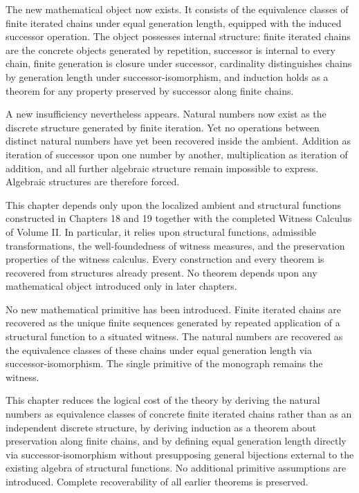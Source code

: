 \documentclass[12pt,anyside]{book}
\begin{document}
The new mathematical object now exists. It consists of the equivalence classes of finite iterated chains under equal generation length, equipped with the induced successor operation. The object possesses internal structure: finite iterated chains are the concrete objects generated by repetition, successor is internal to every chain, finite generation is closure under successor, cardinality distinguishes chains by generation length under successor-isomorphism, and induction holds as a theorem for any property preserved by successor along finite chains.

A new insufficiency nevertheless appears. Natural numbers now exist as the discrete structure generated by finite iteration. Yet no operations between distinct natural numbers have yet been recovered inside the ambient. Addition as iteration of successor upon one number by another, multiplication as iteration of addition, and all further algebraic structure remain impossible to express. Algebraic structures are therefore forced.

\begin{dependencyaudit}
This chapter depends only upon the localized ambient and structural functions constructed in Chapters 18 and 19 together with the completed Witness Calculus of Volume II. In particular, it relies upon structural functions, admissible transformations, the well-foundedness of witness measures, and the preservation properties of the witness calculus. Every construction and every theorem is recovered from structures already present. No theorem depends upon any mathematical object introduced only in later chapters.
\end{dependencyaudit}

\begin{primitiveaudit}
No new mathematical primitive has been introduced. Finite iterated chains are recovered as the unique finite sequences generated by repeated application of a structural function to a situated witness. The natural numbers are recovered as the equivalence classes of these chains under equal generation length via successor-isomorphism. The single primitive of the monograph remains the witness.
\end{primitiveaudit}

\begin{reductionaudit}
This chapter reduces the logical cost of the theory by deriving the natural numbers as equivalence classes of concrete finite iterated chains rather than as an independent discrete structure, by deriving induction as a theorem about preservation along finite chains, and by defining equal generation length directly via successor-isomorphism without presupposing general bijections external to the existing algebra of structural functions. No additional primitive assumptions are introduced. Complete recoverability of all earlier theorems is preserved.
\end{reductionaudit}
\end{document}
